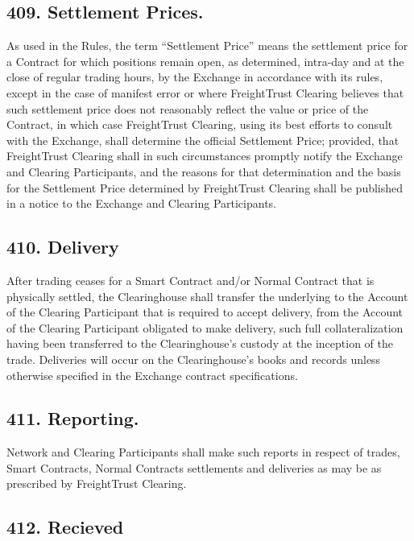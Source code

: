 \documentclass[12pt]{article}
\begin{document}
\hypertarget{settlement-prices.}{%
\subsection{409. Settlement Prices.}\label{settlement-prices.}}

As used in the Rules, the term ``Settlement Price'' means the settlement
price for a Contract for which positions remain open, as determined,
intra-day and at the close of regular trading hours, by the Exchange in
accordance with its rules, except in the case of manifest error or where
FreightTrust Clearing believes that such settlement price does not
reasonably reflect the value or price of the Contract, in which case
FreightTrust Clearing, using its best efforts to consult with the
Exchange, shall determine the official Settlement Price; provided, that
FreightTrust Clearing shall in such circumstances promptly notify the
Exchange and Clearing Participants, and the reasons for that
determination and the basis for the Settlement Price determined by
FreightTrust Clearing shall be published in a notice to the Exchange and
Clearing Participants.

\hypertarget{delivery}{%
\subsection{410. Delivery}\label{delivery}}

After trading ceases for a Smart Contract and/or Normal Contract that is
physically settled, the Clearinghouse shall transfer the underlying to
the Account of the Clearing Participant that is required to accept
delivery, from the Account of the Clearing Participant obligated to make
delivery, such full collateralization having been transferred to the
Clearinghouse's custody at the inception of the trade. Deliveries will
occur on the Clearinghouse's books and records unless otherwise
specified in the Exchange contract specifications.

\hypertarget{reporting.}{%
\subsection{411. Reporting.}\label{reporting.}}

Network and Clearing Participants shall make such reports in respect of
trades, Smart Contracts, Normal Contracts settlements and deliveries as
may be as prescribed by FreightTrust Clearing.

\hypertarget{recieved}{%
\subsection{412. Recieved}\label{recieved}}
\end{document}
